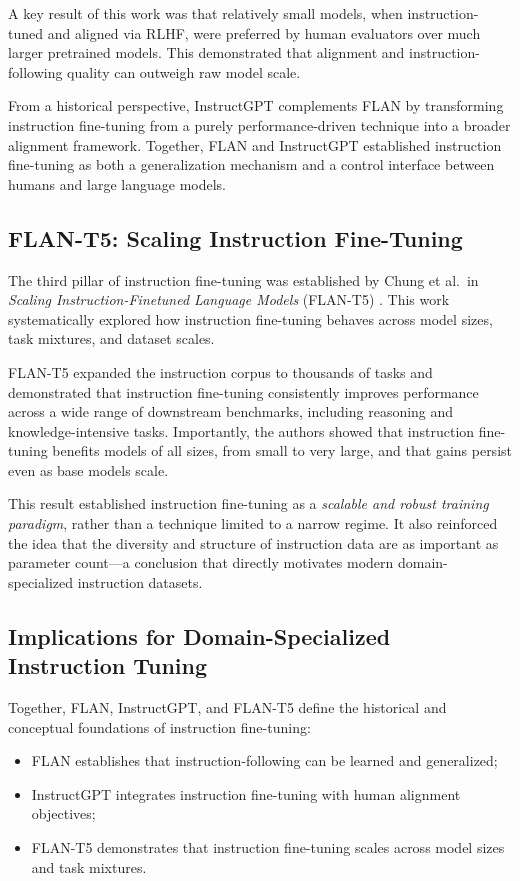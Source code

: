 \documentclass[unnumsec,webpdf,contemporary,large]{oup-authoring-template}
\theoremstyle{thmstyleone}
\theoremstyle{thmstyletwo}
\theoremstyle{thmstylethree}
\begin{document}
A key result of this work was that relatively small models, when instruction-tuned and aligned via RLHF, were preferred by human evaluators over much larger pretrained models. This demonstrated that alignment and instruction-following quality can outweigh raw model scale.

From a historical perspective, InstructGPT complements FLAN by transforming instruction fine-tuning from a purely performance-driven technique into a broader alignment framework. Together, FLAN and InstructGPT established instruction fine-tuning as both a generalization mechanism and a control interface between humans and large language models.

\subsection{FLAN-T5: Scaling Instruction Fine-Tuning}
\label{sec:ift-flant5}

The third pillar of instruction fine-tuning was established by Chung et al.\ in \emph{Scaling Instruction-Finetuned Language Models} (FLAN-T5) \cite{chung2022flant5}. This work systematically explored how instruction fine-tuning behaves across model sizes, task mixtures, and dataset scales.

FLAN-T5 expanded the instruction corpus to thousands of tasks and demonstrated that instruction fine-tuning consistently improves performance across a wide range of downstream benchmarks, including reasoning and knowledge-intensive tasks. Importantly, the authors showed that instruction fine-tuning benefits models of all sizes, from small to very large, and that gains persist even as base models scale.

This result established instruction fine-tuning as a \emph{scalable and robust training paradigm}, rather than a technique limited to a narrow regime. It also reinforced the idea that the diversity and structure of instruction data are as important as parameter count---a conclusion that directly motivates modern domain-specialized instruction datasets.

\subsection{Implications for Domain-Specialized Instruction Tuning}
\label{sec:ift-implications}

Together, FLAN, InstructGPT, and FLAN-T5 define the historical and conceptual foundations of instruction fine-tuning:
\begin{itemize}
  \item FLAN establishes that instruction-following can be learned and generalized;
  \item InstructGPT integrates instruction fine-tuning with human alignment objectives;
  \item FLAN-T5 demonstrates that instruction fine-tuning scales across model sizes and task mixtures.
\end{itemize}
\end{document}
